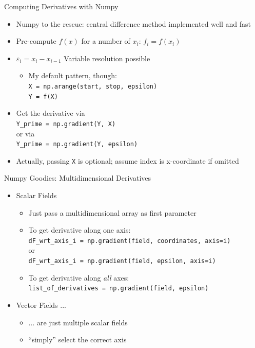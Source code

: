 \begin{frame}{Computing Derivatives with Numpy}
%
\begin{itemize}
\item Numpy to the rescue: central difference method implemented well and fast
\item Pre-compute $f(x)$ for a number of $x_i$: $f_i = f(x_i)$
\item $\varepsilon_i = x_i - x_{i - 1}$ \Thus Variable resolution possible
	\begin{itemize}
	\item My default pattern, though:\\
		\texttt{X = np.arange(start, stop, epsilon)}\\
		\texttt{Y = f(X)}
	\end{itemize}
\item Get the derivative via\\
	\texttt{Y\_prime = np.gradient(Y, X)}\\
	or via\\
	\texttt{Y\_prime = np.gradient(Y, epsilon)}
\item Actually, passing \texttt{X} is optional; assume index is x-coordinate if omitted
\end{itemize}
%
\end{frame}


\begin{frame}{Numpy Goodies: Multidimensional Derivatives}
%
\begin{itemize}
\item Scalar Fields
	\begin{itemize}
	\item Just pass a multidimensional array as first parameter
	\item To get derivative along one axis:\\
		\texttt{dF\_wrt\_axis\_i = np.gradient(field, coordinates, axis=i)}\\
		or\\
		\texttt{dF\_wrt\_axis\_i = np.gradient(field, epsilon, axis=i)}\\
	\item To get derivative along \emph{all} axes:\\
		\texttt{list\_of\_derivatives = np.gradient(field, epsilon)}
	\end{itemize}
\item Vector Fields ...
	\begin{itemize}
	\item ... are just multiple scalar fields
	\item \enquote{simply} select the correct axis
	\end{itemize}
\end{itemize}
%
\end{frame}

